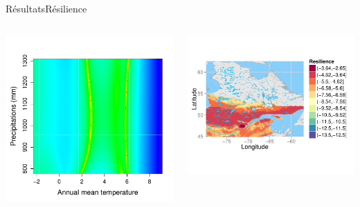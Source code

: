 \documentclass[10pt,aspectratio=149]{beamer}
\begin{document}

   \begin{frame}{Résultats}{Résilience}
      \begin{columns}
         \begin{column}{0.5\textwidth}
            \begin{center}
               \includegraphics[height=0.6\textheight]{Figs/Eig_clim_space}
           \end{center}
         \end{column}
         \begin{column}{0.5\textwidth}
            \begin{center}
               \includegraphics[height=0.7\textheight]{Figs/Eig_map}
           \end{center}
         \end{column}
      \end{columns}  
   \end{frame}
\end{document}
